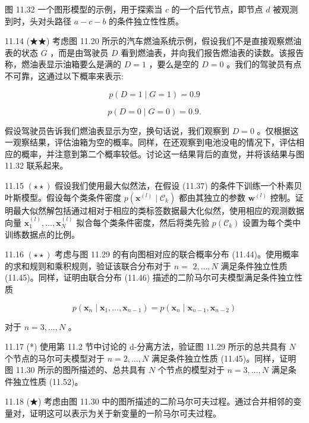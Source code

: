 \documentclass[10pt]{article}
\begin{document}
图 11.32 一个图形模型的示例，用于探索当 \(c\) 的一个后代节点，即节点 \(d\) 被观测到时，头对头路径 \(a - c - b\) 的条件独立性性质。

11.14 (★★) 考虑图 11.20 所示的汽车燃油系统示例，假设我们不是直接观察燃油表的状态 \(G\) ，而是由驾驶员 \(D\) 看到燃油表，并向我们报告燃油表的读数。该报告称，燃油表显示油箱要么是满的 \(D = 1\) ，要么是空的 \(D = 0\) 。我们的驾驶员有点不可靠，这通过以下概率来表示:

\[
p\left( {D = 1 \mid  G = 1}\right)  = {0.9} \tag{11.50}
\]

\[
p\left( {D = 0 \mid  G = 0}\right)  = {0.9}. \tag{11.51}
\]

假设驾驶员告诉我们燃油表显示为空，换句话说，我们观察到 \(D = 0\) 。仅根据这一观察结果，评估油箱为空的概率。同样，在还观察到电池没电的情况下，评估相应的概率，并注意到第二个概率较低。讨论这一结果背后的直觉，并将该结果与图 11.32 联系起来。

11.15 \(\left( {\star  \star  }\right)\) 假设我们使用最大似然法，在假设 (11.37) 的条件下训练一个朴素贝叶斯模型。假设每个类条件密度 \(p\left( {{\mathbf{x}}^{\left( l\right) } \mid  {\mathcal{C}}_{k}}\right)\) 都由其独立的参数 \({\mathbf{w}}^{\left( l\right) }\) 控制。证明最大似然解包括通过相对于相应的类标签数据最大化似然，使用相应的观测数据向量 \({\mathbf{x}}_{1}^{\left( l\right) },\ldots ,{\mathbf{x}}_{N}^{\left( l\right) }\) 拟合每个类条件密度，然后将类先验 \(p\left( {\mathcal{C}}_{k}\right)\) 设置为每个类中训练数据点的比例。

11.16 \(\left( {\star  \star  }\right)\) 考虑与图 11.29 的有向图相对应的联合概率分布 (11.44)。使用概率的求和规则和乘积规则，验证该联合分布对于 \(n =\)  \(2,\ldots ,N\) 满足条件独立性质 (11.45)。同样，证明由联合分布 (11.46) 描述的二阶马尔可夫模型满足条件独立性质

\[
p\left( {{\mathbf{x}}_{n} \mid  {\mathbf{x}}_{1},\ldots ,{\mathbf{x}}_{n - 1}}\right)  = p\left( {{\mathbf{x}}_{n} \mid  {\mathbf{x}}_{n - 1},{\mathbf{x}}_{n - 2}}\right)  \tag{11.52}
\]

对于 \(n = 3,\ldots ,N\) 。

11.17 (*) 使用第 11.2 节中讨论的 d-分离方法，验证图 11.29 所示的总共具有 \(N\) 个节点的马尔可夫模型对于 \(n = 2,\ldots ,N\) 满足条件独立性质 (11.45)。同样，证明图 11.30 所示的图所描述的、总共具有 \(N\) 个节点的模型对于 \(n = 3,\ldots ,N\) 满足条件独立性质 (11.52)。

11.18 (★) 考虑由图 11.30 中的图所描述的二阶马尔可夫过程。通过合并相邻的变量对，证明这可以表示为关于新变量的一阶马尔可夫过程。
\end{document}
